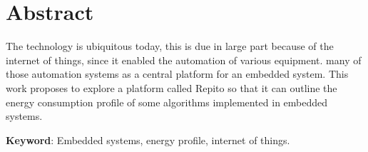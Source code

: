 \chapter*{Abstract}


\noindent The technology is ubiquitous today, this is due in large part because of the internet of things, since it enabled the automation of various equipment. many of those automation systems as a central platform for an embedded system. This work proposes to explore a platform called Repito so that it can outline the energy consumption profile of some algorithms implemented in embedded systems.
 
 \textbf{Keyword}: Embedded systems, energy profile, internet of things.

 